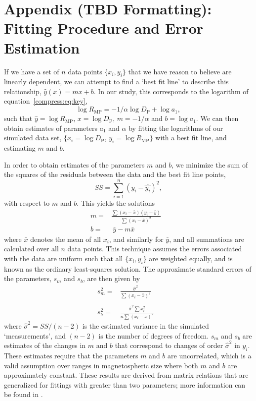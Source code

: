 \section{Appendix (TBD Formatting): Fitting Procedure and Error Estimation}

If we have a set of $n$ data points $\{x_i,y_i\}$ that we have reason to believe are linearly dependent, we can attempt to find a `best fit line' to describe this relationship, $\hat{y}(x) = mx + b$. In our study, this corresponds to the logarithm of equation~\ref{compress:eq:key},
\begin{equation}
\log{R_\mathrm{MP}}{=}-1/{\alpha}\log {D_\mathrm{P}}+\log{a_1},
\end{equation}
such that $\hat{y} = \log{R_\mathrm{MP}}$, $x =\log{D_\mathrm{P}}$, $ m = -1/\alpha$ and $b = \log{a_1}$. We can then obtain estimates of parameters $a_1$ and $\alpha$ by fitting the logarithms of our simulated data set, $\{x_i=\log{D_\mathrm{P}}$, $y_i=\log{R_\mathrm{MP}}\}$ with a best fit line, and estimating $m$ and $b$.

In order to obtain estimates of the parameters $m$ and $b$, we minimize the sum of the squares of the residuals between the data and the best fit line points,
\begin{equation}
SS = \sum\limits_{i=1}^{n}(y_i-\hat{y_i})^2,
\end{equation}
with respect to $m$ and $b$. This yields the solutions
\begin{align}
 m  = &  \frac{\sum(x_i-\bar{x})(y_i-\bar{y})}{\sum(x_i-\bar{x})^2} & \nonumber\\ 
 b  = & \ \bar{y} - m\bar{x} &
\end{align}
where $\bar{x}$ denotes the mean of all $x_i$, and similarly for $\bar{y}$, and all summations are calculated over all $n$ data points. This technique assumes the errors associated with the data are uniform such that all $\{x_i,y_i\}$ are weighted equally, and is known as the ordinary least-squares solution. The approximate standard errors of the parameters, $s_m$ and $s_b$, are then given by
\begin{align}
s_m^2 = & \frac{\hat{\sigma}^2}{\sum(x_i-\bar{x})^2}\nonumber\\ &
\nonumber\\
s_b^2 = & \frac{\hat{\sigma}^2\sum x_i^2}{n\sum(x_i-\bar{x})^2} &
\end{align}
where $\hat{\sigma}^2 = SS/(n-2)$ is the estimated variance in the simulated `measurements', and $(n-2)$ is the number of degrees of freedom. $s_m$ and $s_b$ are estimates of the changes in $m$ and $b$ that correspond to changes of order $\hat{\sigma}^2$ in $y_i$. These estimates require that the parameters $m$ and $b$ are uncorrelated, which is a valid assumption over ranges in magnetospheric size where both $m$ and $b$ are approximately constant. These results are derived from matrix relations that are generalized for fittings with greater than two parameters; more information can be found in \citet{yang2005}.

